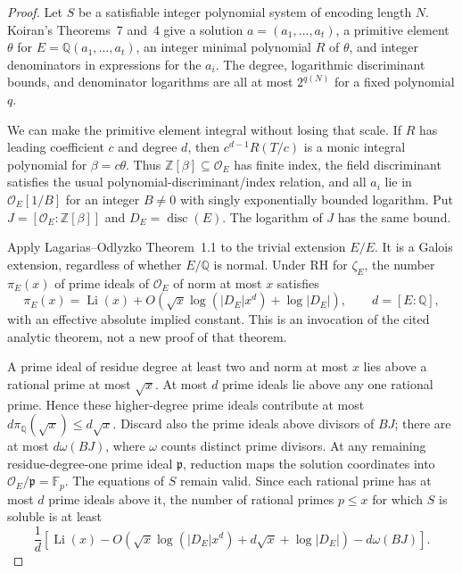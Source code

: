 \documentclass[11pt,a4paper]{article}
\begin{document}
\begin{proof}
Let $S$ be a satisfiable integer polynomial system of encoding length
$N$. Koiran's Theorems~7 and~4 give a solution
$a=(a_1,\ldots,a_t)$, a primitive element $\theta$ for
$E=\mathbb Q(a_1,\ldots,a_t)$, an integer minimal polynomial $R$ of
$\theta$, and integer denominators in expressions for the $a_i$.
The degree, logarithmic discriminant bounds, and denominator logarithms
are all at most $2^{q(N)}$ for a fixed polynomial $q$.

We can make the primitive element integral without losing that scale.
If $R$ has leading coefficient $c$ and degree $d$, then
$c^{d-1}R(T/c)$ is a monic integral polynomial for
$\beta=c\theta$. Thus $\mathbb Z[\beta]\subseteq\mathcal O_E$
has finite index, the field discriminant satisfies the usual
polynomial-discriminant/index relation, and all $a_i$ lie in
$\mathcal O_E[1/B]$ for an integer $B\ne0$ with singly exponentially
bounded logarithm. Put $J=[\mathcal O_E:\mathbb Z[\beta]]$ and
$D_E=\operatorname{disc}(E)$. The logarithm of $J$ has the same bound.

Apply Lagarias--Odlyzko Theorem~1.1 to the trivial extension $E/E$.
It is a Galois extension, regardless of whether $E/\mathbb Q$ is
normal. Under RH for $\zeta_E$, the number $\pi_E(x)$ of prime ideals
of $\mathcal O_E$ of norm at most $x$ satisfies
\begin{equation}
 \pi_E(x)=\operatorname{Li}(x)+
 O\!\left(\sqrt{x}\log(|D_E|x^d)+\log |D_E|\right),
 \qquad d=[E:\mathbb Q],
 \label{eq:k01primeideal}
\end{equation}
with an effective absolute implied constant. This is an invocation of
the cited analytic theorem, not a new proof of that theorem.

A prime ideal of residue degree at least two and norm at most $x$
lies above a rational prime at most $\sqrt{x}$. At most $d$ prime
ideals lie above any one rational prime. Hence these higher-degree
prime ideals contribute at most $d\pi_{\mathbb Q}(\sqrt{x})\le
d\sqrt{x}$. Discard also the prime ideals above divisors of $BJ$;
there are at most $d\omega(BJ)$, where $\omega$ counts distinct prime
divisors. At any remaining residue-degree-one prime ideal
$\mathfrak p$, reduction maps the solution coordinates into
$\mathcal O_E/\mathfrak p=\mathbb F_p$. The equations of $S$ remain
valid. Since each rational prime has at most $d$ prime ideals above it,
the number of rational primes $p\le x$ for which $S$ is soluble is at
least
\begin{equation}
 \frac{1}{d}\left[
 \operatorname{Li}(x)
 -O\!\left(\sqrt{x}\log(|D_E|x^d)+d\sqrt{x}+\log|D_E|\right)
 -d\omega(BJ)\right].
 \label{eq:k01usefulprimes}
\end{equation}


\end{proof}
\end{document}
